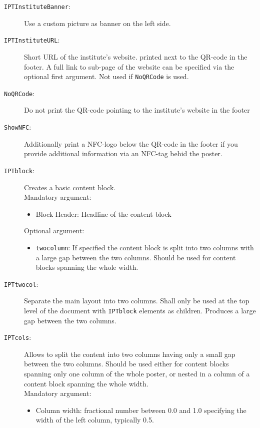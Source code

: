 \begin{description}
	\item[\texttt{IPTInstituteBanner}:] Use a custom picture as banner on the left side.

	\item[\texttt{IPTInstituteURL}:] Short URL of the institute's website. printed next to the QR-code in the footer. A full link to sub-page of the website can be specified via the optional first argument. Not used if \texttt{\bs{}NoQRCode} is used.

	\item[\texttt{NoQRCode}:] Do not print the QR-code pointing to the institute's website in the footer

	\item[\texttt{ShowNFC}:] Additionally print a NFC-logo below the QR-code in the footer if you provide additional information via an NFC-tag behid the poster.


	\item[\texttt{IPTblock}:] Creates a basic content block. \\
		Mandatory argument: 
		\begin{itemize}
			\item Block Header: Headline of the content block
		\end{itemize}
		Optional argument:
		\begin{itemize}
			\item \texttt{twocolumn}: If specified the content block is split into two columns with a large gap between the two columns. Should be used for content blocks spanning the whole width.
		\end{itemize}


	\item[\texttt{IPTtwocol}:] Separate the main layout into two columns. Shall only be used at the top level of the document with \texttt{IPTblock} elements as children. Produces a large gap between the two columns.

	\item[\texttt{IPTcols}:] Allows to split the content into two columns having only a small gap between the two columns. Should be used either for content blocks spanning only one column of the whole poster, or nested in a column of a content block spanning the whole width.\\
	Mandatory argument:
		\begin{itemize}
			\item Column width: fractional number between 0.0 and 1.0 specifying the width of the left column, typically 0.5.
		\end{itemize}


\end{description}
